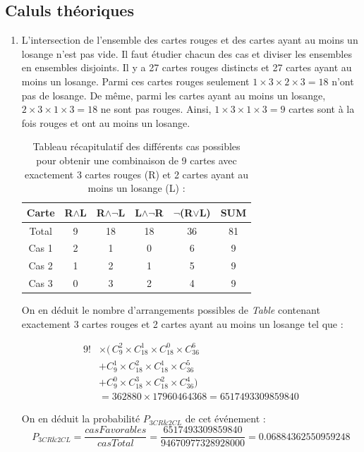 \documentclass{report}
\begin{document}
\subsection{Caluls théoriques}
\begin{enumerate}
	\item [\fcolorbox{black}{black}{\textbf{\textcolor{white}{8}}}] 
	L'intersection de l'ensemble des cartes rouges et des cartes ayant au moins un losange n'est pas vide. Il faut étudier chacun des cas et diviser les ensembles en ensembles disjoints. Il y a 27 cartes rouges distincts et 27 cartes ayant au moins un losange. Parmi ces cartes rouges seulement $1\times3\times2\times3=18$ n'ont pas de losange. De même, parmi les cartes ayant au moins un losange, $2\times3\times1\times3=18$ ne sont pas rouges. Ainsi, $1\times3\times1\times3=9$ cartes sont à la fois rouges et ont au moins un losange. 
\bigskip

\begin{table}[H]
\centering
\begin{tabular}{|c||c c c c||c|} 
 \hline
 Carte & R$\land$L & R$\land\neg$L & L$\land\neg$R & $\neg$(R$\lor$L) & SUM \\ [0.5ex] 
 \hline\hline
 Total & 9 & 18 & 18 & 36 & 81\\ 
 Cas 1 & 2 & 1 & 0 & 6 & 9 \\
 Cas 2 & 1 & 2 & 1 & 5 & 9 \\
 Cas 3 & 0 & 3 & 2 & 4 & 9\\[1ex] 
 \hline
\end{tabular}
\caption{Tableau récapitulatif des différents cas possibles pour obtenir une combinaison de 9 cartes avec exactement 3 cartes rouges (R) et 2 cartes ayant au moins un losange (L) :}
\end{table}

\newpage

On en déduit le nombre d'arrangements possibles de \textit{Table} contenant exactement 3 cartes rouges et 2 cartes ayant au moins un losange tel que :

\begin{align*}
9! &\times(\,C^{2}_{9} \times C^{1}_{18} \times C^{0}_{18} \times C^{6}_{36} \\
&+C^{1}_{9} \times C^{2}_{18} \times C^{1}_{18} \times C^{5}_{36} \\
&+C^{0}_{9} \times C^{3}_{18} \times C^{2}_{18} \times C^{4}_{36} )\, \\
&= 362880 \times 17960464368 = 6517493309859840
\end{align*}

On en déduit la probabilité $P_{3CR\&2CL}$ de cet événement :
	$$P_{3CR\&2CL} = \dfrac{casFavorables}{casTotal} = \dfrac{6517493309859840}{94670977328928000} = 0.06884362550959248 $$
\end{enumerate}
\end{document}
